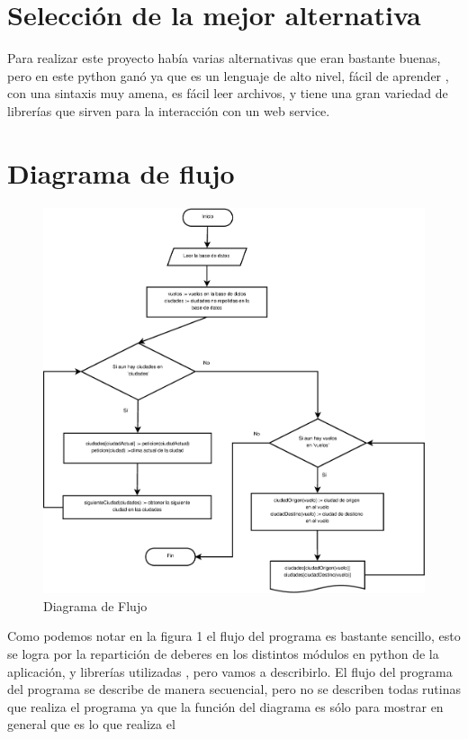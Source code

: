 \documentclass{article}
\begin{document}
\section{Selección de la mejor alternativa}
Para realizar este proyecto había varias alternativas que eran bastante buenas, pero en este python ganó ya que es un lenguaje de alto nivel, fácil de aprender , con una sintaxis muy amena, es fácil leer archivos, y tiene una gran variedad de librerías que sirven para la interacción con un web service. 
\section{Diagrama de flujo}
\begin{figure}[h]
    \includegraphics[scale=.26]{imagenes/DiagramaDeFlujo.eps} 
    \caption{Diagrama de Flujo}
    \label{fig:my_label}
\end{figure}
Como podemos notar en la figura 1 el flujo del programa es bastante sencillo, esto se logra por la repartición de deberes en los distintos módulos en python de la aplicación, y librerías utilizadas , pero vamos a describirlo.
\newline
\newline
El flujo del programa del programa se describe de manera secuencial, pero no se describen todas rutinas que realiza el programa ya que la función del diagrama es sólo para mostrar en general que es lo que realiza el 
\end{document}
